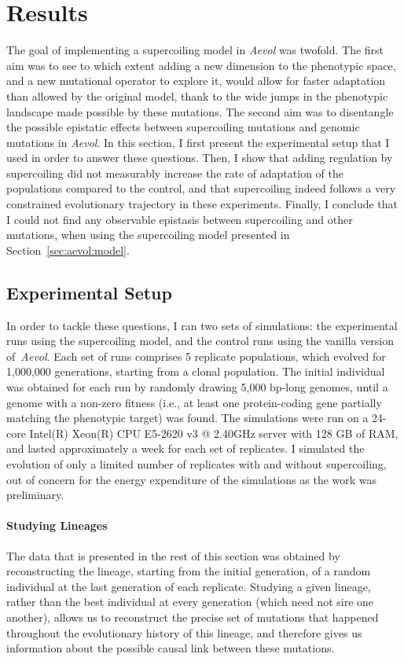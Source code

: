 \section{Results}
\label{sec:aevol:results}

The goal of implementing a supercoiling model in \emph{Aevol} was twofold.
The first aim was to see to which extent adding a new dimension to the phenotypic space, and a new mutational operator to explore it, would allow for faster adaptation than allowed by the original model, thank to the wide jumps in the phenotypic landscape made possible by these mutations.
The second aim was to disentangle the possible epistatic effects between supercoiling mutations and genomic mutations in \emph{Aevol}.
In this section, I first present the experimental setup that I used in order to answer these questions.
Then, I show that adding regulation by supercoiling did not measurably increase the rate of adaptation of the populations compared to the control, and that supercoiling indeed follows a very constrained evolutionary trajectory in these experiments.
Finally, I conclude that I could not find any observable epistasis between supercoiling and other mutations, when using the supercoiling model presented in Section~\ref{sec:aevol:model}.

\subsection{Experimental Setup}

In order to tackle these questions, I ran two sets of simulations: the experimental runs using the supercoiling model, and the control runs using the vanilla version of \emph{Aevol}.
Each set of runs comprises 5 replicate populations, which evolved for 1,000,000 generations, starting from a clonal population.
The initial individual was obtained for each run by randomly drawing 5,000 bp-long genomes, until a genome with a non-zero fitness (i.e., at least one protein-coding gene partially matching the phenotypic target) was found.
The simulations were run on a 24-core Intel(R) Xeon(R) CPU E5-2620 v3 @ 2.40GHz server with 128 GB of RAM, and lasted approximately a week for each set of replicates.
I simulated the evolution of only a limited number of replicates with and without supercoiling, out of concern for the energy expenditure of the simulations as the work was preliminary.


\paragraph{Studying Lineages}
The data that is presented in the rest of this section was obtained by reconstructing the lineage, starting from the initial generation, of a random individual at the last generation of each replicate.
Studying a given lineage, rather than the best individual at every generation (which need not sire one another), allows us to reconstruct the precise set of mutations that happened throughout the evolutionary history of this lineage, and therefore gives us information about the possible causal link between these mutations.

